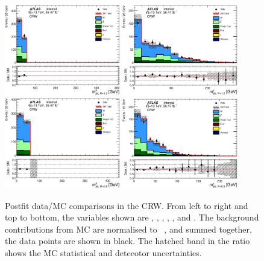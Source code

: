 \begin{figure}[!htb]
  \centering
  \includegraphics[width=0.45\textwidth]{figures/wJets/postfit/AntiKt12M_0__CRW.eps}
  \includegraphics[width=0.45\textwidth]{figures/wJets/postfit/AntiKt12M_1__CRW.eps}
  \includegraphics[width=0.45\textwidth]{figures/wJets/postfit/AntiKt8M_0__CRW.eps}
  \includegraphics[width=0.45\textwidth]{figures/wJets/postfit/AntiKt8M_1__CRW.eps}
  \caption{Postfit data/MC comparisons in the CRW. From left to right and top to bottom, the variables shown are \met, \mtbmin, \mtbmax, \mantikttwelvezero, \mantikttwelveone, and \mantikteightzero. The background contributions from MC are normalised to \intlumi\ \ifb, and summed together, the data points are shown in black. The hatched band in the ratio shows the MC statistical and detecotor uncertainties.}
  \label{fig:CRWMasses}
\end{figure}

